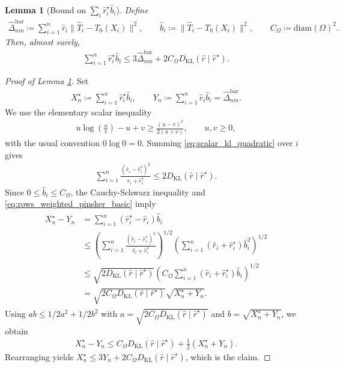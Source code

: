 \documentclass[11pt,reqno]{amsart}
\newtheorem{lemma}[theorem]{Lemma}
\theoremstyle{definition}
\newcommand{\KL}{\mathrm{KL}}
\renewcommand{\hat}{\widehat}
\begin{document}
\begin{lemma}[Bound on $\sum_i\hat r_i^\star\hat b_i$]
\label{lem:uot_weighted_pinsker_rows_hat}
Define
\begin{align*}
    \hat\Delta_{nm}^{\mathrm{bar}}
    \coloneqq
    \sum_{i=1}^n \hat r_i \|\hat T_i-T_0(X_i)\|^2,
    \qquad
    \hat b_i \coloneqq \|\hat T_i-T_0(X_i)\|^2,
    \qquad
    C_\Omega \coloneqq \mathrm{diam}(\Omega)^2.
\end{align*}
Then, almost surely,
\begin{align}
    \sum_{i=1}^n \hat r_i^\star \hat b_i
    \le
    3\hat\Delta_{nm}^{\mathrm{bar}}
    + 2C_\Omega {D_\KL}(\hat r\mid \hat r^\star).
\end{align}
\end{lemma}


\begin{proof}[Proof of Lemma \ref{lem:uot_weighted_pinsker_rows_hat}]


Set
\begin{align}
    X_n^\star \coloneqq \sum_{i=1}^n \hat r_i^\star \hat b_i,
    \qquad
    Y_n \coloneqq \sum_{i=1}^n \hat r_i \hat b_i
    = \hat\Delta_{nm}^{\mathrm{bar}}.
\end{align}
We use the elementary scalar inequality
\begin{align}
\label{eq:scalar_kl_quadratic}
    u\log \left(\frac{u}{v}\right)-u+v
    \ge
    \frac{(u-v)^2}{2(u+v)},
    \qquad u,v\ge 0,
\end{align}
with the usual convention $0\log 0=0$.
Summing \eqref{eq:scalar_kl_quadratic} over $i$ gives
\begin{align}
\label{eq:rows_weighted_pinsker_basic}
    \sum_{i=1}^n \frac{(\hat r_i-\hat r_i^\star)^2}{\hat r_i+\hat r_i^\star}
    \le
    2 {D_\KL}(\hat r\mid \hat r^\star).
\end{align}
Since $0\le \hat b_i\le C_\Omega$, the Cauchy-Schwarz inequality and \eqref{eq:rows_weighted_pinsker_basic} imply
\begin{align}
\begin{aligned}
    X_n^\star-Y_n
    &= \sum_{i=1}^n (\hat r_i^\star-\hat r_i)\hat b_i \\
    &\le
    \left(
        \sum_{i=1}^n \frac{(\hat r_i-\hat r_i^\star)^2}{\hat r_i+\hat r_i^\star}
    \right)^{1/2}
    \left(
        \sum_{i=1}^n (\hat r_i+\hat r_i^\star)\hat b_i^2
    \right)^{1/2} \\
    &\le
    \sqrt{2{D_\KL}(\hat r\mid \hat r^\star)}
    \left(
        C_\Omega \sum_{i=1}^n (\hat r_i+\hat r_i^\star)\hat b_i
    \right)^{1/2} \\
    &=
    \sqrt{2C_\Omega {D_\KL}(\hat r\mid \hat r^\star)}
      \sqrt{X_n^\star+Y_n}.
\end{aligned}
\end{align}
Using $ab\le {1/2} a^2+{1/2} b^2$ with $a=\sqrt{2C_\Omega {D_\KL}(\hat r\mid \hat r^\star)}$ and $b=\sqrt{X_n^\star+Y_n}$, we obtain
\begin{align}
    X_n^\star-Y_n
    \le
    C_\Omega {D_\KL}(\hat r\mid \hat r^\star)
    + \tfrac{1}{2}(X_n^\star+Y_n).
\end{align}
Rearranging yields $X_n^\star \le 3Y_n + 2C_\Omega {D_\KL}(\hat r\mid \hat r^\star)$, which is the claim.


\end{proof}
\end{document}
